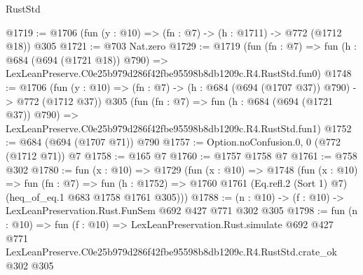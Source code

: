 \begin{lexlean}{RustStd}
\begin{coremodule}
@1719 := @1706 (fun (y : @10) => (fn : @7) -> (h : @1711) -> @772 (@1712 @18)) @305
@1721 := @703 Nat.zero
@1729 := @1719
    (fun (fn : @7) =>
    fun (h : @684 (@694 (@1721 @18)) @790) =>
    LexLeanPreserve.C0e25b979d286f42fbe95598b8db1209c.R4.RustStd.fun0)
@1748 := @1706
    (fun (y : @10) => (fn : @7) -> (h : @684 (@694 (@1707 @37)) @790) -> @772 (@1712 @37))
    @305
    (fun (fn : @7) =>
    fun (h : @684 (@694 (@1721 @37)) @790) =>
    LexLeanPreserve.C0e25b979d286f42fbe95598b8db1209c.R4.RustStd.fun1)
@1752 := @684 (@694 (@1707 @71)) @790
@1757 := Option.noConfusion.{0, 0} (@772 (@1712 @71)) @7
@1758 := @165 @7
@1760 := @1757 @1758 @7
@1761 := @758 @302
@1780 := fun (x : @10) =>
  @1729
    (fun (x : @10) =>
    @1748
      (fun (x : @10) =>
      fun (fn : @7) =>
      fun (h : @1752) =>
      @1760 @1761 (Eq.refl.{2} (Sort 1) @7) (heq_of_eq.{1} @683 @1758 @1761 @305)))
@1788 := (n : @10) -> (f : @10) -> LexLeanPreservation.Rust.FunSem @692 @427 @771 @302 @305
@1798 := fun (n : @10) =>
  fun (f : @10) =>
  LexLeanPreservation.Rust.simulate
    @692
    @427
    @771
    LexLeanPreserve.C0e25b979d286f42fbe95598b8db1209c.R4.RustStd.crate_ok
    @302
    @305
\end{coremodule}
\end{lexlean}
